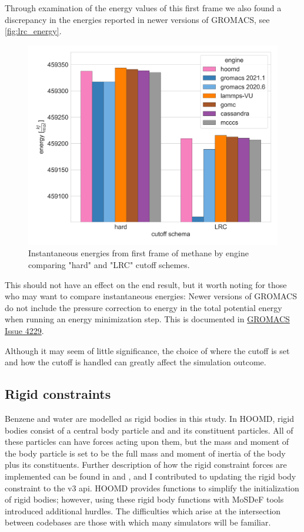 Through examination of the energy values of this first frame we also found a discrepancy in the energies reported in newer versions of GROMACS, see \autoref{fig:lrc_energy}.
\begin{figure}[h!]
    \centering
    \includegraphics[width=0.6\linewidth,keepaspectratio]{figures/rep_study/lrc_energy.png}
    \caption{Instantaneous energies from first frame of methane by engine comparing "hard" and "LRC" cutoff schemes.}\label{fig:lrc_energy}
\end{figure}
This should not have an effect on the end result, but it worth noting for those who may want to compare instantaneous energies:
Newer versions of GROMACS do not include the pressure correction to energy in the total potential energy when running an energy minimization step. 
This is documented in \href{https://gitlab.com/gromacs/gromacs/-/issues/4229}{GROMACS Issue 4229}.

Although it may seem of little significance, the choice of where the cutoff is set and how the cutoff is handled can greatly affect the simulation outcome.

\subsection{Rigid constraints}

Benzene and water are modelled as rigid bodies in this study.
In HOOMD, rigid bodies consist of a central body particle and and its constituent particles. 
All of these particles can have forces acting upon them, but the mass and moment of the body particle is set to be the full mass and moment of inertia of the body plus its constituents.  
Further description of how the rigid constraint forces are implemented can be found in \citet{Nguyen2011a} and \citet{Glaser2020a}, and I contributed to updating the rigid body constraint to the v3 api.
HOOMD provides functions to simplify the initialization of rigid bodies; however, using these rigid body functions with MoSDeF tools introduced additional hurdles. 
The difficulties which arise at the intersection between codebases are those with which many simulators will be familiar.

